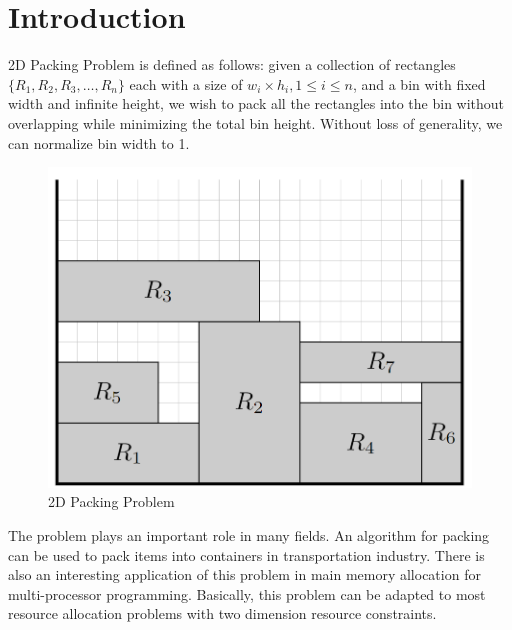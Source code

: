 \documentclass[sigplan,screen,nonacm]{acmart}\settopmatter{printfolios=true,printccs=false,printacmref=false}
\begin{document}
\maketitle

\section{Introduction}
2D Packing Problem is defined as follows: given a collection of rectangles $\{R_1,R_2,R_3,\dots,R_n\}$ each with a size of $w_i\times h_i, 1\leq i\leq n$, and a bin with fixed width and infinite height, we wish to pack all the rectangles into the bin without overlapping while minimizing the total bin height\cite{baker1980orthogonal}. Without loss of generality, we can normalize bin width to 1.\par
\begin{figure}[htbp]
  \centering
  \includegraphics[scale=0.5]{2dpacking}
  \caption{2D Packing Problem}
  \label{fig:2dpacking}
\end{figure}
The problem plays an important role in many fields. An algorithm for packing can be used to pack items into containers in transportation industry. There is also an interesting application of this problem in main memory allocation for multi-processor programming. Basically, this problem can be adapted to most resource allocation problems with two dimension resource constraints.
\end{document}
